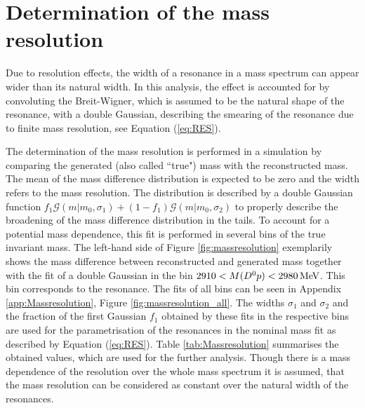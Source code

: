 \section{Determination of the mass resolution}
\label{sec:Massresolution}
Due to resolution effects, the width of a resonance in a mass spectrum can appear wider than its natural width.
In this analysis, the effect is accounted for by convoluting the Breit-Wigner, which is assumed to be the natural shape of the resonance, with a double Gaussian, describing the smearing of the resonance due to finite mass resolution, see Equation (\ref{eq:RES}).

The determination of the mass resolution is performed in a simulation by comparing the generated (also called ``true") mass with the reconstructed mass.
The mean of the mass difference distribution is expected to be zero and the width refers to the mass resolution.
The distribution is described by a double Gaussian function $f_1 \mathcal{G}(m|m_0,\sigma_1) + (1-f_1) \mathcal{G}(m|m_0,\sigma_2)$ to properly describe the broadening of the mass difference distribution in the tails.
To account for a potential mass dependence, this fit is performed in several bins of the true invariant \Dz\proton mass.
The left-hand side of Figure \ref{fig:massresolution} exemplarily shows the mass difference between reconstructed and generated mass together with the fit of a double Gaussian in the bin $2910 < M({{D}^0}{p}) < 2980 \mathrm{\,Me\kern -0.1em V}$.
This bin corresponds to the \LcResII resonance.
The fits of all bins can be seen in Appendix \ref{app:Massresolution}, Figure \ref{fig:massresolution_all}.
The widths $\sigma_1$ and $\sigma_2$ and the fraction of the first Gaussian $f_1$ obtained by these fits in the respective bins are used for the parametrisation of the resonances in the nominal \Dz\proton mass fit as described by Equation (\ref{eq:RES}).
Table \ref{tab:Massresolution} summarises the obtained values, which are used for the further analysis.
Though there is a mass dependence of the resolution over the whole \Dz\proton mass spectrum it is assumed, that the mass resolution can be considered as constant over the natural width of the resonances.
